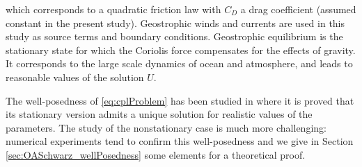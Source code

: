 which corresponds to a quadratic friction law with $C_D$ 
a drag coefficient (assumed constant in the present study).
%
%
Geostrophic winds and currents are used in this study as
source terms and boundary conditions. 
Geostrophic equilibrium is the stationary state for which the 
Coriolis force compensates for the effects of gravity.
It corresponds to the large scale dynamics of ocean and 
atmosphere, and leads to reasonable values of the solution $U$. \par
The well-posedness of \eqref{eq:cplProblem} has been studied in 
\cite{thery_etude_2021}
where it is proved that its stationary version admits a unique
solution for realistic values of the parameters. The study of the
nonstationary case is much more challenging: numerical experiments
tend to confirm this well-posedness and we give in Section
\ref{sec:OASchwarz_wellPosedness} some elements for a theoretical proof.
%
%
%
%
%
%
%
%
%
% 
%
%


